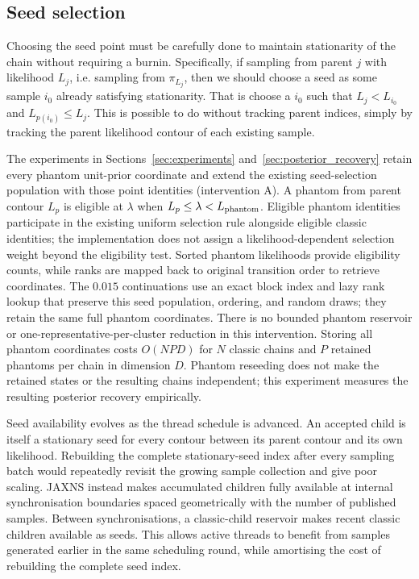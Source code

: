 \documentclass[pdflatex,sn-basic,icol]{sn-jnl}
\theoremstyle{plain}
\theoremstyle{definition}
\begin{document}
\subsection{Seed selection}

Choosing the seed point must be carefully done to maintain stationarity of the chain without requiring a burnin.
Specifically, if sampling from parent $j$ with likelihood $L_j$, i.e. sampling from $\pi_{L_j}$, then we should choose a seed as some sample $i_0$ already satisfying stationarity.
That is choose a $i_0$ such that $L_j < L_{i_0}$ and $L_{p(i_0)} \le L_j$.
This is possible to do without tracking parent indices, simply by tracking the parent likelihood contour of each existing sample.

The experiments in Sections~\ref{sec:experiments} and~\ref{sec:posterior_recovery} retain every phantom unit-prior coordinate and extend the existing seed-selection population with those point identities (intervention A).
A phantom from parent contour $L_p$ is eligible at $\lambda$ when $L_p\le\lambda<L_{\rm phantom}$.
Eligible phantom identities participate in the existing uniform selection rule alongside eligible classic identities; the implementation does not assign a likelihood-dependent selection weight beyond the eligibility test.
Sorted phantom likelihoods provide eligibility counts, while ranks are mapped back to original transition order to retrieve coordinates. The $0.015$ continuations use an exact block index and lazy rank lookup that preserve this seed population, ordering, and random draws; they retain the same full phantom coordinates.
There is no bounded phantom reservoir or one-representative-per-cluster reduction in this intervention.
Storing all phantom coordinates costs $O(NPD)$ for $N$ classic chains and $P$ retained phantoms per chain in dimension $D$.
Phantom reseeding does not make the retained states or the resulting chains independent; this experiment measures the resulting posterior recovery empirically.

Seed availability evolves as the thread schedule is advanced.
An accepted child is itself a stationary seed for every contour between its parent contour and its own likelihood.
Rebuilding the complete stationary-seed index after every sampling batch would repeatedly revisit the growing sample collection and give poor scaling.
JAXNS instead makes accumulated children fully available at internal synchronisation boundaries spaced geometrically with the number of published samples.
Between synchronisations, a classic-child reservoir makes recent classic children available as seeds.
This allows active threads to benefit from samples generated earlier in the same scheduling round, while amortising the cost of rebuilding the complete seed index.
\end{document}
